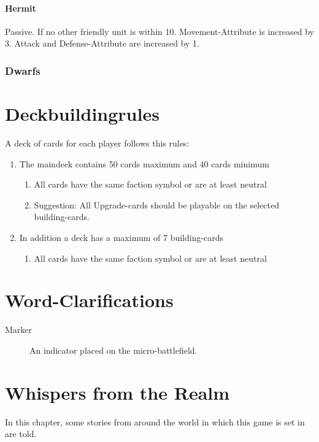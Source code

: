 \documentclass[a5paper,pagesize,10pt,bibtotoc,pointlessnumbers,
normalheadings,DIV=9,twoside=false]{scrbook}
\begin{document}
\subsubsection{Hermit}
Passive. If no other friendly unit is within 10. Movement-Attribute is increased by 3. Attack and Defense-Attribute are increased by 1.

\newpage
\subsection{Dwarfs}

\chapter{Deckbuildingrules}

A deck of cards for each player follows this rules:

\begin{enumerate}
\item The maindeck contains 50 cards maximum and 40 cards minimum
\begin{enumerate}
\item All cards have the same faction symbol or are at least neutral
\item Suggestion: All Upgrade-cards should be playable on the selected building-cards.
\end{enumerate}
\item In addition a deck has a maximum of 7 building-cards
\begin{enumerate}
\item All cards have the same faction symbol or are at least neutral
\end{enumerate}
\end{enumerate}

\chapter{Word-Clarifications}

\begin{description}
\item[Marker]
An indicator placed on the micro-battlefield.
\end{description}


\chapter{Whispers from the Realm}

In this chapter, some stories from around the world in which this game is set in are told.
\end{document}
